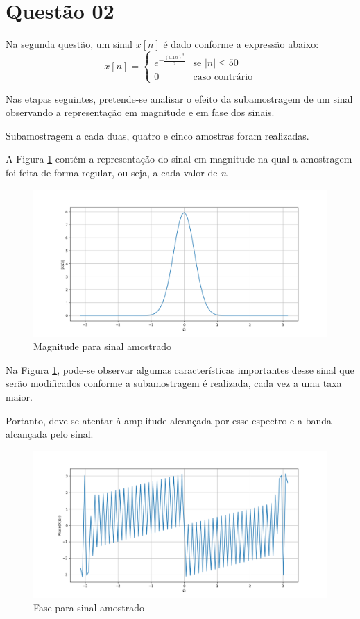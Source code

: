\newpage
\section{Questão 02}
Na segunda questão, um sinal  $x[n]$ é dado conforme a expressão abaixo:
\[
x[n] = 
\begin{cases} 
e^{-\frac{(0.1n)^2}{2}} & \text{se } |n| \leq 50 \\ 
0 & \text{caso contrário}
\end{cases}
\]

Nas etapas seguintes, pretende-se analisar o efeito da subamostragem de um sinal observando a representação em magnitude e em fase dos sinais. 

Subamostragem a cada duas, quatro e cinco amostras foram realizadas.

A Figura \ref{fig:graph_09} contém a representação do sinal em magnitude na qual a amostragem foi feita de forma regular, ou seja, a cada valor de \textit{n}. 

\begin{figure}[!htb]
    \centering
    \includegraphics[width=\linewidth]{Imagens/fig09.png}
    \caption{Magnitude para sinal amostrado}
    \label{fig:graph_09}
\end{figure}

Na Figura \ref{fig:graph_09}, pode-se observar algumas características importantes desse sinal que serão modificados conforme a subamostragem é realizada, cada vez a uma taxa maior. 

Portanto, deve-se atentar à amplitude alcançada por esse espectro e a banda alcançada pelo sinal.

\begin{figure}[!htb]
    \centering
    \includegraphics[width=\linewidth]{Imagens/fig10.png}
    \caption{Fase para sinal amostrado}
    \label{fig:graph_10}
\end{figure}


